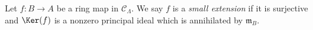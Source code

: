 \begin{definition}
\label{definition-small-extension}
Let $f: B \to A$ be a ring map in $\mathcal{C}_\Lambda$.  We say $f$
is a {\it small extension} if it is surjective and $\Ker(f)$ is a nonzero
principal ideal which is annihilated by $\mathfrak{m}_B$.
\end{definition}